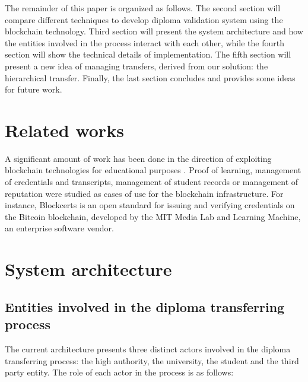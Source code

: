 \documentclass[conference]{IEEEtran}
\begin{document}
    The remainder of this paper is organized as follows. The second section will compare different techniques to develop diploma validation system using the blockchain technology. Third section will present the system architecture and how the entities involved in the process interact with each other, while the fourth section will show the technical details of implementation. The fifth section will present a new idea of managing transfers, derived from our solution: the hierarchical transfer.  Finally, the last section concludes and provides some ideas for future work.

\section{Related works}
    A significant amount of work has been done in the direction of exploiting blockchain technologies for educational purposes \cite{grech2017blockchain, skiba2017potential, deshpande2017distributed}. Proof of learning, management of credentials \cite{hope2018issue} and transcripts, management of student records or management of reputation were studied as cases of use for the blockchain infrastructure. For instance, Blockcerts \cite{schmidt2016blockcerts} is an open standard for issuing and verifying credentials on the Bitcoin blockchain, developed by the MIT Media Lab and Learning Machine, an enterprise software vendor.
    
    


\section{System architecture}
\subsection{Entities involved in the diploma transferring process}

The current architecture presents three distinct actors involved in the diploma transferring process: the high authority, the university, the student and the third party entity. The role of each actor in the process is as follows: 
\end{document}
